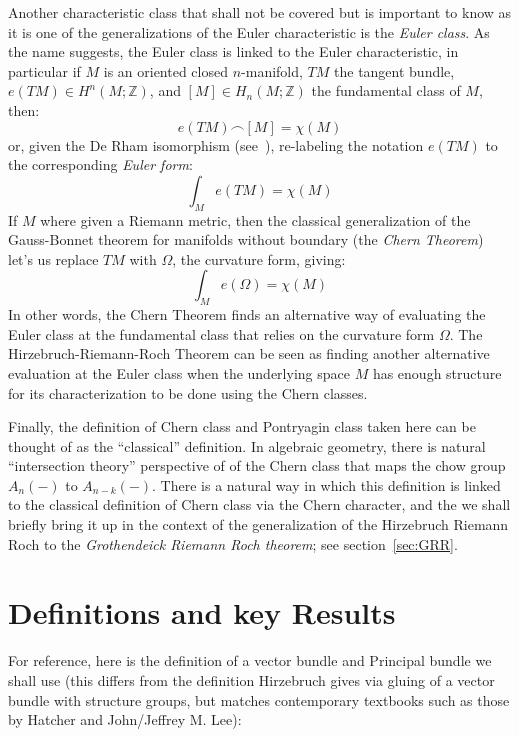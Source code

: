\documentclass{book}
\newcommand{\Z}{{\mathbb{Z}}}
\begin{document}
Another characteristic class that shall not be covered but is important to know as it is one of the
generalizations of the Euler characteristic is the \emph{Euler class}. As
the name suggests, the Euler class is linked to the Euler characteristic, in particular if $M$ is an oriented
closed $n$-manifold, $TM$ the tangent bundle, $e(TM) \in H^n(M; \Z)$, and $[M] \in H_n(M; \Z)$ the fundamental class of $M$, then:
\[
  e(TM) \frown [M] = \chi(M)
\]
or, given the De Rham isomorphism (see~\cite{NateDiffGeo}), re-labeling the notation $e(TM)$ to the corresponding \emph{Euler form}:
\[
  \int_M e(TM) = \chi(M)
\]
If $M$ where given a Riemann metric, then the classical generalization of the Gauss-Bonnet theorem for
manifolds without boundary (the \emph{Chern Theorem}) let's us replace $TM$ with $\Omega$, the curvature form,
giving:
\[
  \int_M e(\Omega) = \chi(M)
\]
In other words, the Chern Theorem finds an alternative way of evaluating the Euler class at the fundamental
class that relies on the curvature form $\Omega$. The Hirzebruch-Riemann-Roch Theorem can be seen as
finding another alternative evaluation at the Euler class when the underlying space $M$ has enough structure for
its characterization to be done using the Chern classes.

Finally, the definition of Chern class and Pontryagin class taken here can be thought of as the ``classical''
definition. In algebraic geometry, there is natural ``intersection theory'' perspective of of the Chern class
that maps the chow group $A_n(-)$ to $A_{n-k}(-)$. There is a natural way in which this definition is linked
to the classical definition of Chern class via the Chern character, and the we shall briefly bring it up in the context of the generalization of the
Hirzebruch Riemann Roch to the \emph{Grothendeick Riemann Roch theorem}; see section~\ref{sec:GRR}.

\section{Definitions and key Results}

For reference, here is the definition of a vector bundle and Principal bundle we shall use (this differs from
the definition Hirzebruch gives via gluing of a vector bundle with structure groups, but matches contemporary
textbooks such as those by Hatcher and John/Jeffrey M. Lee):
\end{document}
